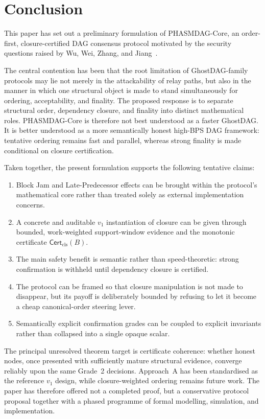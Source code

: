 \documentclass[11pt]{article}
\theoremstyle{definition}
\theoremstyle{plain}
\theoremstyle{remark}
\newcommand{\Certcls}{\mathsf{Cert}_{\mathrm{cls}}}
\begin{document}
\section{Conclusion}\label{sec:conclusion}

This paper has set out a preliminary formulation of PHASMDAG-Core, an
order-first, closure-certified DAG consensus protocol motivated by the security
questions raised by Wu, Wei, Zhang, and Jiang~\cite{wu2024security}.

The central contention has been that the root limitation of GhostDAG-family
protocols may lie not merely in the attackability of relay paths, but also in
the manner in which one structural object is made to stand simultaneously for
ordering, acceptability, and finality.
The proposed response is to separate structural order, dependency closure, and
finality into distinct mathematical roles.
PHASMDAG-Core is therefore not best understood as a faster GhostDAG.
It is better understood as a more semantically honest high-BPS DAG framework:
tentative ordering remains fast and parallel, whereas strong finality is made
conditional on closure certification.

Taken together, the present formulation supports the following tentative
claims:
\begin{enumerate}[nosep]
    \item Block Jam and Late-Predecessor effects can be brought within the
    protocol's mathematical core rather than treated solely as external
    implementation concerns.
    \item A concrete and auditable $v_1$ instantiation of closure can be given
    through bounded, work-weighted support-window evidence and the monotonic
    certificate $\Certcls(B)$.
    \item The main safety benefit is semantic rather than speed-theoretic:
    strong confirmation is withheld until dependency closure is certified.
    \item The protocol can be framed so that closure manipulation is not made
    to disappear, but its payoff is deliberately bounded by refusing to let it
    become a cheap canonical-order steering lever.
    \item Semantically explicit confirmation grades can be coupled to explicit
    invariants rather than collapsed into a single opaque scalar.
\end{enumerate}

The principal unresolved theorem target is certificate coherence:
whether honest nodes, once presented with sufficiently mature structural
evidence, converge reliably upon the same Grade~2 decisions.
Approach~A has been standardised as the reference $v_1$ design, while
closure-weighted ordering remains future work.
The paper has therefore offered not a completed proof, but a conservative
protocol proposal together with a phased programme of formal modelling,
simulation, and implementation.
\end{document}
